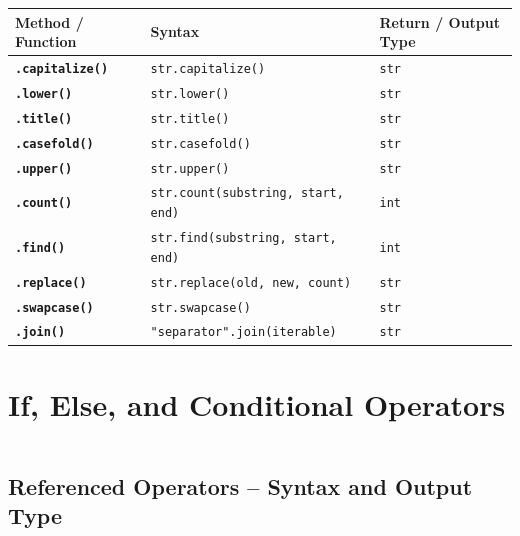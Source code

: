 \documentclass[a4paper,11pt]{article}
\begin{document}
	\begin{tabular}{>{\bfseries}p{3.5cm} p{8cm} p{3cm}}
		\toprule
		Method / Function & Syntax & Return / Output Type \\
		\midrule
		
		\texttt{.capitalize()} & \texttt{str.capitalize()} & \texttt{str} \\
		
		\texttt{.lower()} & \texttt{str.lower()} & \texttt{str} \\
		
		\texttt{.title()} & \texttt{str.title()} & \texttt{str} \\
		
		\texttt{.casefold()} & \texttt{str.casefold()} & \texttt{str} \\
		
		\texttt{.upper()} & \texttt{str.upper()} & \texttt{str} \\
		
		\texttt{.count()} & \texttt{str.count(substring, start, end)} & \texttt{int} \\
		
		\texttt{.find()} & \texttt{str.find(substring, start, end)} & \texttt{int} \\
		
		\texttt{.replace()} & \texttt{str.replace(old, new, count)} & \texttt{str} \\
		
		\texttt{.swapcase()} & \texttt{str.swapcase()} & \texttt{str} \\
		
		\texttt{.join()} & \texttt{"separator".join(iterable)} & \texttt{str} \\
		
		\bottomrule
	\end{tabular}
	
		\newpage
		
	\section{If, Else, and Conditional Operators}
	\inputminted{python}{Python_Files/if_else_guid.py}
	
	\vspace{1em}
	\subsection*{Referenced Operators – Syntax and Output Type}
	
\end{document}
